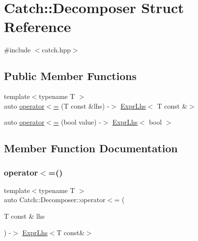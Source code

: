 \hypertarget{struct_catch_1_1_decomposer}{}\section{Catch\+:\+:Decomposer Struct Reference}
\label{struct_catch_1_1_decomposer}


{\ttfamily \#include $<$catch.\+hpp$>$}

\subsection*{Public Member Functions}
\begin{DoxyCompactItemize}
\item 
{\footnotesize template$<$typename T $>$ }\\auto \mbox{\hyperlink{struct_catch_1_1_decomposer_a20b5b8c0e2ff0328a019ae1a8deca03a}{operator$<$=}} (T const \&lhs) -\/$>$ \mbox{\hyperlink{class_catch_1_1_expr_lhs}{Expr\+Lhs}}$<$ T const \&$>$
\item 
auto \mbox{\hyperlink{struct_catch_1_1_decomposer_aac129b94903ae1339d5709049d83613b}{operator$<$=}} (bool value) -\/$>$ \mbox{\hyperlink{class_catch_1_1_expr_lhs}{Expr\+Lhs}}$<$ bool $>$
\end{DoxyCompactItemize}


\subsection{Member Function Documentation}
\mbox{\label{struct_catch_1_1_decomposer_a20b5b8c0e2ff0328a019ae1a8deca03a}} 
\subsubsection{\texorpdfstring{operator$<$=()}{operator<=()}\hspace{0.1cm}{\footnotesize\ttfamily [1/2]}}
{\footnotesize\ttfamily template$<$typename T $>$ \\
auto Catch\+::\+Decomposer\+::operator$<$= (\begin{DoxyParamCaption}\item[{T const \&}]{lhs }\end{DoxyParamCaption}) -\/$>$ \mbox{\hyperlink{class_catch_1_1_expr_lhs}{Expr\+Lhs}}$<$T const\&$>$ \hspace{0.3cm}{\ttfamily [inline]}}

